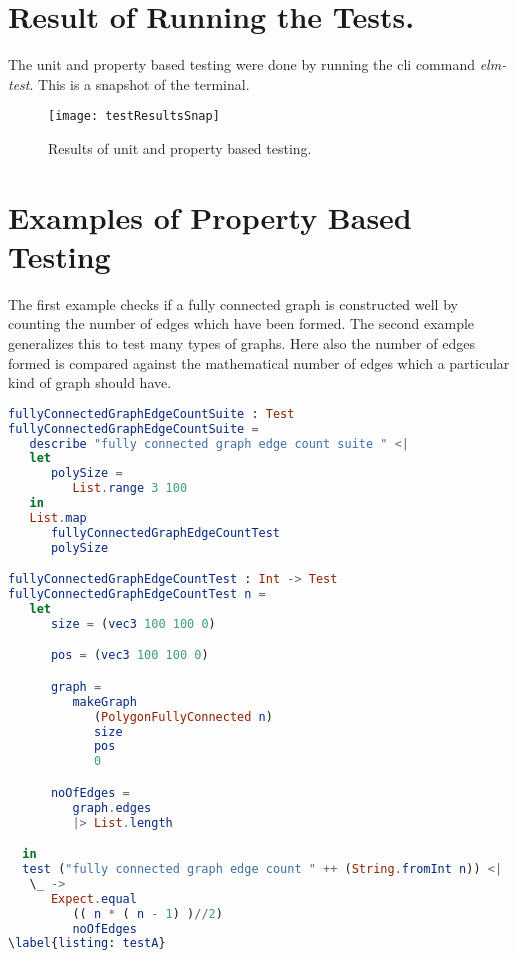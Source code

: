 \graphicspath{ {images/} }

\section{ Result of Running the Tests.}
\label{testing: results}
The unit and property based testing were done by running the cli command \emph{elm-test}.
This is a snapshot of the terminal.

\begin{figure}[!ht]
\centering
\texttt{[image: testResultsSnap]}
\caption{
        Results of unit and property based testing.
        }
\end{figure}

\section{Examples of Property Based Testing}
\label{testing: pbtExamples}
The first example checks if a fully connected graph is constructed well by
counting the number of edges which have been formed. The second example
generalizes this to test many types of graphs. Here also the number of edges
formed is compared against the mathematical number of edges which a particular
kind of graph should have.

\begin{lstlisting}[language=elm
                  , caption={
                  Property Based Testing of construction of a fully
                  connected graph.
                  }
                  ]
fullyConnectedGraphEdgeCountSuite : Test         
fullyConnectedGraphEdgeCountSuite =
   describe "fully connected graph edge count suite " <|
   let
      polySize =
         List.range 3 100
   in
   List.map
      fullyConnectedGraphEdgeCountTest         
      polySize

fullyConnectedGraphEdgeCountTest : Int -> Test         
fullyConnectedGraphEdgeCountTest n =
   let
      size = (vec3 100 100 0)

      pos = (vec3 100 100 0)

      graph =
         makeGraph
            (PolygonFullyConnected n)
            size
            pos
            0

      noOfEdges =
         graph.edges
         |> List.length

  in
  test ("fully connected graph edge count " ++ (String.fromInt n)) <|
   \_ ->
      Expect.equal 
         (( n * ( n - 1) )//2)
         noOfEdges
\label{listing: testA}
\end{lstlisting}

